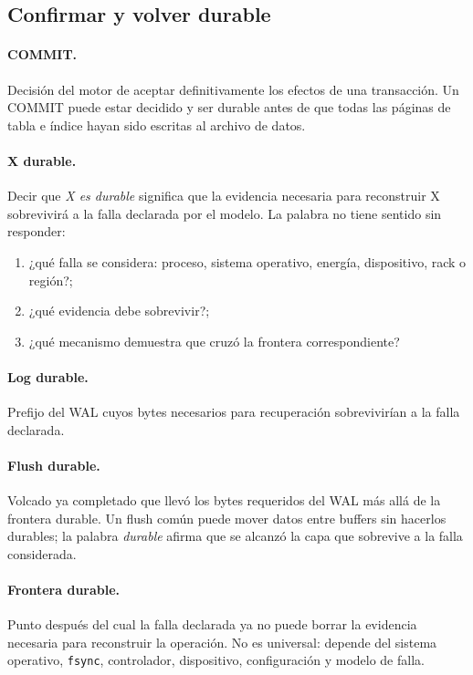 \documentclass[variant=apuntes,cover=institutional,mode=screen]{ua-engineering-v6-article}
\begin{document}
\subsection{Confirmar y volver durable}

\paragraph{COMMIT.} Decisión del motor de aceptar definitivamente los efectos de una transacción. Un COMMIT puede estar decidido y ser durable antes de que todas las páginas de tabla e índice hayan sido escritas al archivo de datos.

\paragraph{X durable.} Decir que \emph{X es durable} significa que la evidencia necesaria para reconstruir X sobrevivirá a la falla declarada por el modelo. La palabra no tiene sentido sin responder:

\begin{enumerate}
\item ¿qué falla se considera: proceso, sistema operativo, energía, dispositivo, rack o región?;
\item ¿qué evidencia debe sobrevivir?;
\item ¿qué mecanismo demuestra que cruzó la frontera correspondiente?
\end{enumerate}

\paragraph{Log durable.} Prefijo del WAL cuyos bytes necesarios para recuperación sobrevivirían a la falla declarada.

\paragraph{Flush durable.} Volcado ya completado que llevó los bytes requeridos del WAL más allá de la frontera durable. Un flush común puede mover datos entre buffers sin hacerlos durables; la palabra \emph{durable} afirma que se alcanzó la capa que sobrevive a la falla considerada.

\paragraph{Frontera durable.} Punto después del cual la falla declarada ya no puede borrar la evidencia necesaria para reconstruir la operación. No es universal: depende del sistema operativo, \texttt{fsync}, controlador, dispositivo, configuración y modelo de falla.
\end{document}
